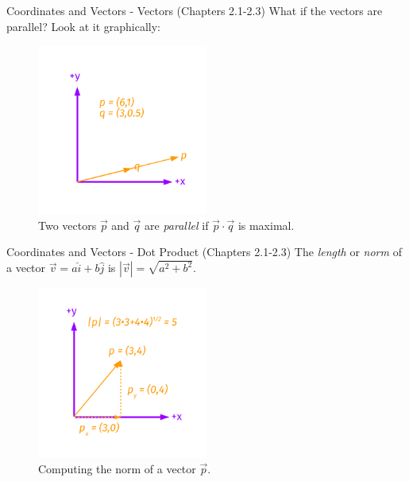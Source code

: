 \documentclass{beamer}
\begin{document}
\begin{frame}{Coordinates and Vectors - Vectors (Chapters 2.1-2.3)}
What if the vectors are parallel? Look at it graphically:
\begin{figure}
\centering
\includegraphics[width=0.5\textwidth,trim=1cm 1cm 1cm 1cm,clip=true]{figures/Vectors6.pdf}
\caption{\label{fig:twovectors5} Two vectors $\vec{p}$ and $\vec{q}$ are \textit{parallel} if $\vec{p} \cdot \vec{q}$ is maximal.}
\end{figure}
\end{frame}

\begin{frame}{Coordinates and Vectors - Dot Product (Chapters 2.1-2.3)}
The \textit{length} or \textit{norm} of a vector $\vec{v} = a\hat{i}+b\hat{j}$ is $|\vec{v}| = \sqrt{a^2+b^2}$.\\
\begin{figure}
\centering
\includegraphics[width=0.5\textwidth,trim=1cm 1cm 1cm 1cm,clip=true]{figures/Vectors7.pdf}
\caption{\label{fig:twovectors6} Computing the norm of a vector $\vec{p}$.}
\end{figure}
\end{frame}
\end{document}
